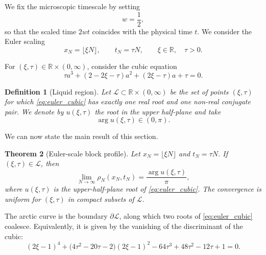 \documentclass[11pt]{article}
\numberwithin{equation}{section}
\newtheorem{theorem}{Theorem}[section]
\newtheorem{definition}[theorem]{Definition}
\newcommand{\1}{\mathbf 1}
\begin{document}

We fix the microscopic timescale by setting
\[
    w=\frac12,
\]
so that the scaled time \(2wt\) coincides with the physical time \(t\). We
consider the Euler scaling
\begin{equation}
    x_N=\lfloor \xi N\rfloor,
    \qquad
    t_N=\tau N,
    \qquad
    \xi\in\mathbb R,
    \quad
    \tau>0.
    \label{eq:euler_scaling}
\end{equation}

For \((\xi,\tau)\in\mathbb R\times(0,\infty)\), consider the cubic equation
\begin{equation}
    \tau a^3
    +(2-2\xi-\tau)a^2
    +(2\xi-\tau)a
    +\tau
    =0.
    \label{eq:euler_cubic}
\end{equation}

\begin{definition}[Liquid region]
\label{def:euler_liquid_region}
Let \(\mathcal L\subset\mathbb R\times(0,\infty)\) be the set of points
\((\xi,\tau)\) for which \eqref{eq:euler_cubic} has exactly one real root and
one non-real conjugate pair. We denote by \(u(\xi,\tau)\) the root in the upper
half-plane and take
\[
    \arg u(\xi,\tau)\in(0,\pi).
\]
\end{definition}

We can now state the main result of this section.

\begin{theorem}[Euler-scale block profile]
\label{thm:euler_block_profile}
Let \(x_N=\lfloor \xi N\rfloor\) and \(t_N=\tau N\). If
\((\xi,\tau)\in\mathcal L\), then
\begin{equation}
    \lim_{N\to\infty}
    \rho_N(x_N,t_N)
    =
    \frac{\arg u(\xi,\tau)}{\pi},
    \label{eq:euler_density_limit}
\end{equation}
where \(u(\xi,\tau)\) is the upper-half-plane root of
\eqref{eq:euler_cubic}. The convergence is uniform for
\((\xi,\tau)\) in compact subsets of \(\mathcal L\).
\end{theorem}


The arctic curve is the boundary \(\partial\mathcal L\), along which two roots
of \eqref{eq:euler_cubic} coalesce. Equivalently, it is given by the vanishing
of the discriminant of the cubic:
\begin{equation}
    (2\xi-1)^4
    +
    \bigl(4\tau^2-20\tau-2\bigr)(2\xi-1)^2
    -64\tau^3+48\tau^2-12\tau+1
    =
    0.
    \label{eq:euler_arctic_curve}
\end{equation}
\end{document}
